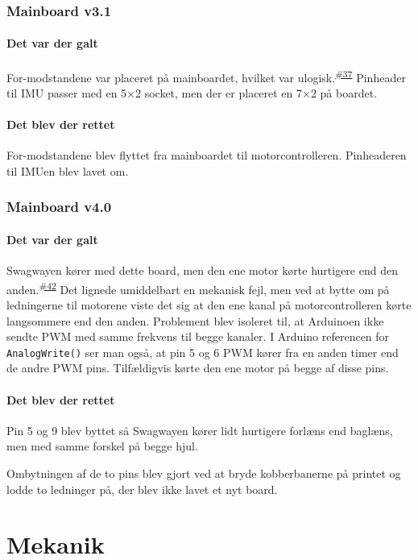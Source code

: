 \documentclass[a4paper,11pt,oneside,article,danish,table]{memoir}
\newcommand{\boarddate}[1]{\marginpar{\tiny\textcolor{blue!80!black}{#1}}}
\newcommand{\issue}[1]{\textsuperscript{\textcolor{blue!80!black}{\href{https://github.com/neic/Swagway/issues/#1}{\##1}}}}
\begin{document}
\subsection{Mainboard v3.1}
\boarddate{29 marts 2012}
\subsubsection{Det var der galt}
For-modstandene var placeret på mainboardet, hvilket var ulogisk.\issue{37}
Pinheader til IMU passer med en 5×2 socket, men der er placeret en 7×2 på boardet.
\subsubsection{Det blev der rettet}
For-modstandene blev flyttet fra mainboardet til motorcontrolleren. Pinheaderen til IMUen blev lavet om.
\subsection{Mainboard v4.0}\label{sec:main40}
\boarddate{24 april 2012}
\subsubsection{Det var der galt}
Swagwayen kører med dette board, men den ene motor kørte hurtigere end den anden.\issue{42} Det lignede umiddelbart en mekanisk fejl, men ved at bytte om på ledningerne til motorene viste det sig at den ene kanal på motorcontrolleren kørte langsommere end den anden. 
Problement blev isoleret til, at Arduinoen ikke sendte PWM med samme frekvens til begge kanaler. I Arduino referencen for \lstinline{AnalogWrite()} ser man også, at pin 5 og 6 PWM kører fra en anden timer end de andre PWM pins. Tilfældigvis kørte den ene motor på begge af disse pins. 

\subsubsection{Det blev der rettet}
Pin 5 og 9 blev byttet så Swagwayen kører lidt hurtigere forlæns end baglæns, men med samme forskel på begge hjul.

Ombytningen af de to pins blev gjort ved at bryde kobberbanerne på printet og lodde to ledninger på, der blev ikke lavet et nyt board.

\chapter{Mekanik}
\end{document}
